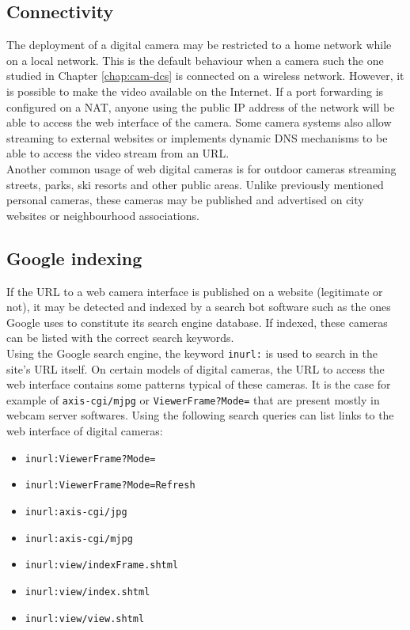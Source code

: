 \subsection{Connectivity}

The deployment of a digital camera may be restricted to a home network while on a local network.
This is the default behaviour when a camera such the one studied in Chapter \ref{chap:cam-dcs} is connected on a wireless network. 
However, it is possible to make the video available on the Internet.
If a port forwarding is configured on a NAT, anyone using the public IP address of the network will be able to access the web interface of the camera.
Some camera systems also allow streaming to external websites or implements dynamic DNS mechanisms to be able to access the video stream from an URL.\\

Another common usage of web digital cameras is for outdoor cameras streaming streets, parks, ski resorts and other public areas.
Unlike previously mentioned personal cameras, these cameras may be published and advertised on city websites or neighbourhood associations.

\subsection{Google indexing}

If the URL to a web camera interface is published on a website (legitimate or not), it may be detected and indexed by a search bot software such as the ones Google uses to constitute its search engine database.
If indexed, these cameras can be listed with the correct search keywords.\\

Using the Google search engine, the keyword \texttt{inurl:} is used to search in the site's URL itself.
On certain models of digital cameras, the URL to access the web interface contains some patterns typical of these cameras.
It is the case for example of \texttt{axis-cgi/mjpg} or \texttt{ViewerFrame?Mode=} that are present mostly in webcam server softwares.
Using the following search queries can list links to the web interface of digital cameras:

\begin{itemize}
\item \texttt{inurl:ViewerFrame?Mode=}
\item \texttt{inurl:ViewerFrame?Mode=Refresh}
\item \texttt{inurl:axis-cgi/jpg}
\item \texttt{inurl:axis-cgi/mjpg}
\item \texttt{inurl:view/indexFrame.shtml}
\item \texttt{inurl:view/index.shtml}
\item \texttt{inurl:view/view.shtml}
\end{itemize}

